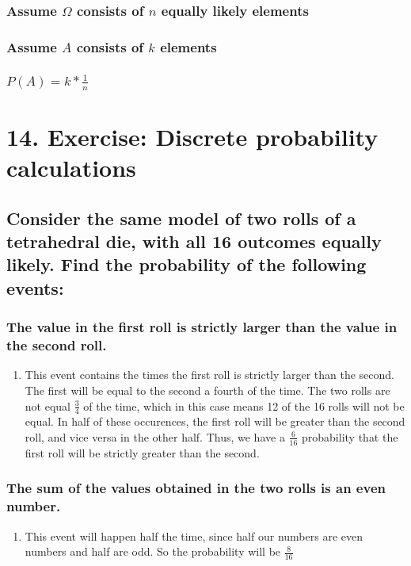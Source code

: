 \documentclass[11pt]{article}
\begin{document}
\subsubsection{Assume \(\Omega\) consists of \(n\) equally likely elements}
\label{sec:orgf743549}
\subsubsection{Assume \(A\) consists of \(k\) elements}
\label{sec:org3b62179}
\subsubsection{\(P(A) = k*\frac{1}{n}\)}
\label{sec:org69c0cc6}
\section{14. Exercise: Discrete probability calculations}
\label{sec:org2a42a63}
\subsection{Consider the same model of two rolls of a tetrahedral die, with all 16 outcomes equally likely. Find the probability of the following events:}
\label{sec:orgddb2aaf}
\subsubsection{The value in the first roll is strictly larger than the value in the second roll.}
\label{sec:org820bd8c}
\begin{enumerate}
\item This event contains the times the first roll is strictly larger than the second. The first will be equal to the second a fourth of the time. The two rolls are not equal \(\frac{3}{4}\) of the time, which in this case means 12 of the 16 rolls will not be equal. In half of these occurences, the first roll will be greater than the second roll, and vice versa in the other half. Thus, we have a \(\frac{6}{16}\) probability that the first roll will be strictly greater than the second.
\label{sec:orgd725fb5}
\end{enumerate}
\subsubsection{The sum of the values obtained in the two rolls is an even number.}
\label{sec:orgd83d20a}
\begin{enumerate}
\item This event will happen half the time, since half our numbers are even numbers and half are odd. So the probability will be \(\frac{8}{16}\)
\label{sec:org474e4d0}
\end{enumerate}
\end{document}
